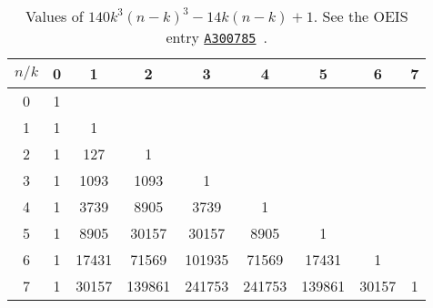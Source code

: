 \begin{table}[H]
    \setlength\extrarowheight{-6pt}
    \begin{tabular}{c|cccccccc}
        $n/k$ & 0 & 1     & 2      & 3      & 4      & 5      & 6     & 7 \\
        \hline
        0     & 1 &       &        &        &        &        &       &   \\
        1     & 1 & 1     &        &        &        &        &       &   \\
        2     & 1 & 127   & 1      &        &        &        &       &   \\
        3     & 1 & 1093  & 1093   & 1      &        &        &       &   \\
        4     & 1 & 3739  & 8905   & 3739   & 1      &        &       &   \\
        5     & 1 & 8905  & 30157  & 30157  & 8905   & 1      &       &   \\
        6     & 1 & 17431 & 71569  & 101935 & 71569  & 17431  & 1     &   \\
        7     & 1 & 30157 & 139861 & 241753 & 241753 & 139861 & 30157 & 1
    \end{tabular}
    \caption{Values of $140 k^3 (n-k)^3 - 14k(n-k) + 1$.
    See the OEIS entry \href{https://oeis.org/A300785}{\texttt{A300785}}~\cite{kolosov2018seventh}.}
    \label{tab:row-sums-gives-seventh-power}
\end{table}
